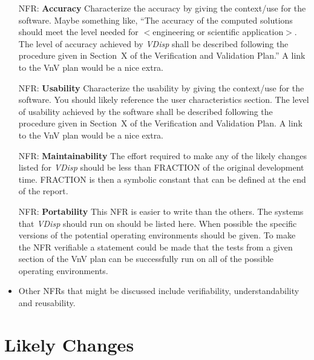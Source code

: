 \documentclass[12pt]{article}
\newcounter{nfrnum} %
\begin{document}
\noindent \begin{itemize}

\item[NFR\refstepcounter{nfrnum}\thenfrnum \label{NFR_Accuracy}:]
  \textbf{Accuracy} Characterize the accuracy by giving the context/use for
    the software.  Maybe something like, ``The accuracy of the computed
    solutions should meet the level needed for $<$engineering or scientific
    application$>$.  The level of accuracy achieved by \emph{VDisp}{} shall be
    described following the procedure given in Section~X of the Verification and
    Validation Plan.''  A link to the VnV plan would be a nice extra.

\item[NFR\refstepcounter{nfrnum}\thenfrnum \label{NFR_Usability}:] \textbf{Usability}
  Characterize the usability by giving the context/use for the software.
    You should likely reference the user characteristics section.  The level of
    usability achieved by the software shall be described following the
    procedure given in Section~X of the Verification and Validation Plan.  A
    link to the VnV plan would be a nice extra.

\item[NFR\refstepcounter{nfrnum}\thenfrnum \label{NFR_Maintainability}:]
  \textbf{Maintainability} The effort required to make any of the likely
    changes listed for \emph{VDisp}{} should be less than FRACTION of the original
    development time.  FRACTION is then a symbolic constant that can be defined
    at the end of the report.

\item[NFR\refstepcounter{nfrnum}\thenfrnum \label{NFR_Portability}:]
  \textbf{Portability} This NFR is easier to write than the others.  The
    systems that \emph{VDisp}{} should run on should be listed here.  When possible
    the specific versions of the potential operating environments should be
    given.  To make the NFR verifiable a statement could be made that the tests
    from a given section of the VnV plan can be successfully run on all of the
    possible operating environments.

\item Other NFRs that might be discussed include verifiability,
  understandability and reusability.

\end{itemize}

\section{Likely Changes}    
\end{document}
